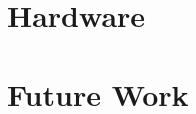 \documentclass[final,12pt,twoside]{mcthesis}
\begin{document}
\newpage
        

\newpage


\newpage


\newpage


\newpage
\chapter{Hardware}

\newpage


\newpage


\newpage
\chapter{Future Work}





\appendix
%
\label{body end}
\end{document}
